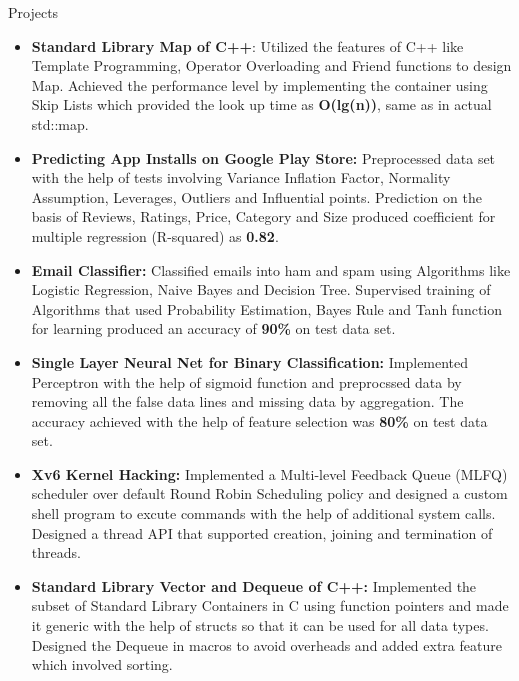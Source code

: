 \documentclass[]{mcdowellcv}
\begin{document}
	\begin{cvsection}{Projects}
		\begin{cvsubsection}{}{}{}
			\begin{itemize}
				\item \textbf{Standard Library Map of C++}: Utilized the features of C++ like Template Programming, Operator Overloading and  Friend functions to design Map. Achieved the performance level by implementing the container using Skip Lists which provided the look up time as \textbf{O(lg(n))}, same as in actual std::map.
				\vspace{1mm}
				\item \textbf{Predicting App Installs on Google Play Store:} Preprocessed data set with the help of tests involving Variance Inflation Factor, Normality Assumption, Leverages, Outliers and Influential points. Prediction on the basis of Reviews, Ratings, Price, Category and Size produced coefficient for multiple regression (R-squared) as \textbf{0.82}.
				\vspace{1mm}
				\item \textbf{Email Classifier:} Classified emails into ham and spam using Algorithms like Logistic Regression, Naive Bayes and Decision Tree. Supervised training of Algorithms that used Probability Estimation, Bayes Rule and Tanh function  for learning produced an accuracy of \textbf{90\%} on test data set.
				\vspace{1mm}
				\item \textbf{Single Layer Neural Net for Binary Classification:} Implemented Perceptron with the help of sigmoid function and preprocssed data by removing all the false data lines and missing data by aggregation. The accuracy achieved with the help of feature selection was  \textbf{80\%} on test data set.
				\vspace{1mm}
				\item \textbf{Xv6 Kernel Hacking:} Implemented a Multi-level Feedback Queue (MLFQ) scheduler over default Round Robin Scheduling policy and designed a custom shell program to excute commands with the help of additional system calls. Designed a thread API that supported creation, joining and termination of threads.
				\vspace{1mm}
				\item \textbf{Standard Library Vector and Dequeue of C++:} Implemented the subset of Standard Library Containers in C using function pointers and made it generic with the help of structs so that it can be used for all data types. Designed the Dequeue in macros to avoid overheads and added extra feature which involved sorting.
				\vspace{1mm}
			\end{itemize}
		\end{cvsubsection}
	\end{cvsection}
\end{document}
